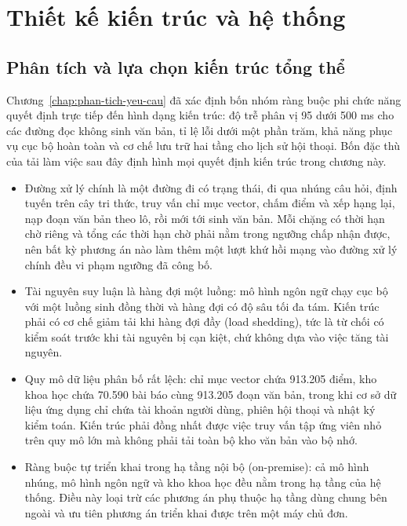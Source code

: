 
\chapter{Thiết kế kiến trúc và hệ thống}
\label{chap:thiet-ke-kien-truc}

\section{Phân tích và lựa chọn kiến trúc tổng thể}
\label{sec:kien-truc-tong-the}

Chương~\ref{chap:phan-tich-yeu-cau} đã xác định bốn nhóm ràng buộc phi chức năng quyết định trực tiếp đến hình dạng kiến trúc: độ trễ phân vị 95 dưới 500 ms cho các đường đọc không sinh văn bản, tỉ lệ lỗi dưới một phần trăm, khả năng phục vụ cục bộ hoàn toàn và cơ chế lưu trữ hai tầng cho lịch sử hội thoại. Bốn đặc thù của tải làm việc sau đây định hình mọi quyết định kiến trúc trong chương này.

\begin{itemize}
    \item[--] Đường xử lý chính là một đường đi có trạng thái, đi qua nhúng câu hỏi, định tuyến trên cây tri thức, truy vấn chỉ mục vector, chấm điểm và xếp hạng lại, nạp đoạn văn bản theo lô, rồi mới tới sinh văn bản. Mỗi chặng có thời hạn chờ riêng và tổng các thời hạn chờ phải nằm trong ngưỡng chấp nhận được, nên bất kỳ phương án nào làm thêm một lượt khứ hồi mạng vào đường xử lý chính đều vi phạm ngưỡng đã công bố.
    \item[--] Tài nguyên suy luận là hàng đợi một luồng: mô hình ngôn ngữ chạy cục bộ với một luồng sinh đồng thời và hàng đợi có độ sâu tối đa tám. Kiến trúc phải có cơ chế giảm tải khi hàng đợi đầy (load shedding), tức là từ chối có kiểm soát trước khi tài nguyên bị cạn kiệt, chứ không dựa vào việc tăng tài nguyên.
    \item[--] Quy mô dữ liệu phân bố rất lệch: chỉ mục vector chứa 913.205 điểm, kho khoa học chứa 70.590 bài báo cùng 913.205 đoạn văn bản, trong khi cơ sở dữ liệu ứng dụng chỉ chứa tài khoản người dùng, phiên hội thoại và nhật ký kiểm toán. Kiến trúc phải đồng nhất được việc truy vấn tập ứng viên nhỏ trên quy mô lớn mà không phải tải toàn bộ kho văn bản vào bộ nhớ.
    \item[--] Ràng buộc tự triển khai trong hạ tầng nội bộ (on-premise): cả mô hình nhúng, mô hình ngôn ngữ và kho khoa học đều nằm trong hạ tầng của hệ thống. Điều này loại trừ các phương án phụ thuộc hạ tầng dùng chung bên ngoài và ưu tiên phương án triển khai được trên một máy chủ đơn.
\end{itemize}

